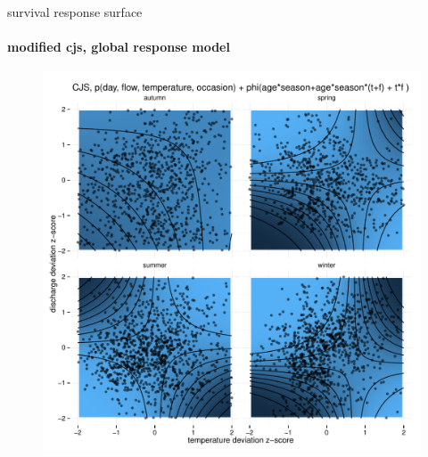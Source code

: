 \documentclass[show notes]{beamer}
\begin{document}
\begin{frame}{survival response surface}
  \framesubtitle{modified cjs, global response model}

	\begin{figure}
	\includegraphics[clip, trim=0 0 0 35, height=.8\textheight]{pl-1-1-cjs-seasonal-logit-recapture_full_RE-phi_full_x-phi-heat-map.pdf}
  	\end{figure}

\end{frame}
\end{document}
